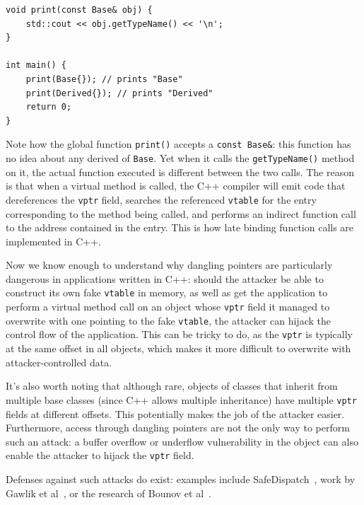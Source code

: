 \begin{lstlisting}
void print(const Base& obj) {
	std::cout << obj.getTypeName() << '\n';
}

int main() {
	print(Base{}); // prints "Base"
	print(Derived{}); // prints "Derived"
	return 0;
}
\end{lstlisting}

Note how the global function \lstinline!print()! accepts a \lstinline!const Base&!: this function has no idea about any derived of \lstinline!Base!. Yet when it calls the \lstinline!getTypeName()! method on it, the actual function executed is different between the two calls. The reason is that when a virtual method is called, the C++ compiler will emit code that dereferences the \texttt{vptr} field, searches the referenced \texttt{vtable} for the entry corresponding to the method being called, and performs an indirect function call to the address contained in the entry. This is how late binding function calls are implemented in C++.

Now we know enough to understand why dangling pointers are particularly dangerous in applications written in C++: should the attacker be able to construct its own fake \texttt{vtable} in memory, as well as get the application to perform a virtual method call on an object whose \texttt{vptr} field it managed to overwrite with one pointing to the fake \texttt{vtable}, the attacker can hijack the control flow of the application. This can be tricky to do, as the \texttt{vptr} is typically at the same offset in all objects, which makes it more difficult to overwrite with attacker-controlled data.

It's also worth noting that although rare, objects of classes that inherit from multiple base classes (since C++ allows multiple inheritance) have multiple \texttt{vptr} fields at different offsets. This potentially makes the job of the attacker easier. Furthermore, access through dangling pointers are not the only way to perform such an attack: a buffer overflow or underflow vulnerability in the object can also enable the attacker to hijack the \texttt{vptr} field.

Defenses against such attacks do exist: examples include SafeDispatch~\cite{cpp-vptr-safedispatch}, work by Gawlik et al~\cite{cpp-vptr-gawlik}, or the research of Bounov et al~\cite{cpp-vptr-bounov}.